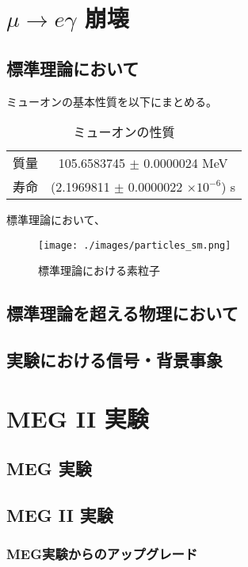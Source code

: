 \documentclass[Yonemoto_master.tex]{subfiles}
\begin{document}
\chapter{$\mu \to e \gamma$ 崩壊}

\section{標準理論において}
ミューオンの基本性質を以下にまとめる。

\begin{table}[h]
 \label{table:Muon_prop}
 \centering
  \begin{tabular}{cc}
   \hline
   質量 & 105.6583745 $\pm$ 0.0000024 MeV \\
   寿命 & (2.1969811 $\pm$ 0.0000022 $\times 10^{-6}$) s \\ 
   \hline
  \end{tabular}
 \caption{ミューオンの性質 \cite{muon}}
\end{table}
   
標準理論において、


\begin{figure}[h]
\begin{center}
\texttt{[image: ./images/particles\_sm.png]}
\caption{標準理論における素粒子 \cite{particles_sm}}
\end{center}
\end{figure}

\section{標準理論を超える物理において}
\section{実験における信号・背景事象}

\chapter{MEG II 実験}

\section{MEG 実験}
\section{MEG II 実験}
\subsection{MEG実験からのアップグレード}
\end{document}
